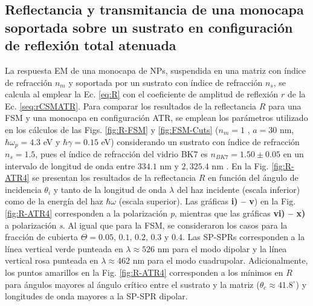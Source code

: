 	\subsection{Reflectancia y transmitancia de una monocapa soportada sobre un sustrato en configuración de reflexión total atenuada}
	\label{ssection:DrudeATR}

La respuesta EM de una monocapa de NPs, suspendida en una matriz con índice de refracción $n_m$ y soportada por un sustrato con índice de refracción $n_s$, se calcula al emplear la Ec.  \eqref{eq:R} con el coeficiente de amplitud de reflexión $r$ de la Ec.  \eqref{seq:rCSMATR}. Para comparar los resultados de la reflectancia $R$ para una FSM y una monocapa en configuración ATR, se emplean los parámetros utilizado en los cálculos de las Figs. \ref{fig:R-FSM} y \ref{fig:FSM-Cuts} ($n_m=1$ , $a=30$ nm, $\hbar\omega_p=4.3$ eV y  $\hbar\gamma = 0.15$ eV) considerando un sustrato con índice de refracción $n_s=1.5$, pues el índice de refracción del vidrio BK7 es $n_{BK7}=1.50\pm 0.05$ en un intervalo de longitud de onda entre $334.1$ nm y $2,325.4$ nm \cite{schott2019datasheet}. En la Fig.  \ref{fig:R-ATR4} se presentan los resultados de la reflectancia $R$ en función del ángulo de incidencia $\theta_i$ y tanto de la longitud de onda $\lambda$ del haz incidente (escala inferior) como de la energía del haz $\hbar\omega$ (escala superior). Las gráficas \textbf{i) -- v}) en la Fig. \ref{fig:R-ATR4}  corresponden a la polarización \emph{p}, mientras que las gráficas \textbf{vi) -- x)} a polarización \emph{s}. Al igual que para la FSM, se consideraron los casos para la fracción de cubierta $\Theta = 0.05,\,0.1,\,0.2,\,0.3$ y $0.4$. Las SP-SPRs corresponden a la línea vertical verde punteada en $\lambda \approx 526$ nm para el modo dipolar y la línea vertical rosa punteada en  $\lambda \approx 462$ nm para el modo cuadrupolar. Adicionalmente, los puntos amarillos en la Fig. \ref{fig:R-ATR4} corresponden a los mínimos en $R$ para ángulos mayores al ángulo crítico entre el sustrato y la matriz ($\theta_c\approx 41.8^\circ$) y longitudes de onda mayores a la SP-SPR dipolar.

